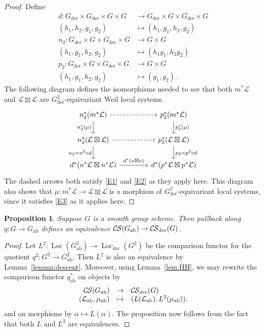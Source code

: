 \documentclass[10pt]{amsart}
\theoremstyle{plain}
\newtheorem{proposition}[theorem]{Proposition}
\theoremstyle{definition}
\DeclareMathOperator{\Loc}{Loc}
\newcommand{\der}{_{\operatorname{der}}}
\newcommand{\ab}{_{\operatorname{ab}}}
\newcommand{\cs}[1]{{\mathcal{#1}}}
\newcommand{\CS}{{\mathcal{C\hskip-0.8pt S}}}
\begin{document}
\begin{proof} 
Define
\begin{align*}
d : G\der\times G\der\times G\times G &\to G\der\times G\times G\der\times G \\
(h_1,h_2,g_1,g_2) &\mapsto (h_1, g_1, h_2, g_2)\\
n_2 : G\der\times G\times G\der\times G &\to G\times G \\
(h_1,g_1,h_2,g_2) &\mapsto (h_1g_1, h_2g_2) \\
p_2 : G\der\times G\times G\der\times G &\to G\times G \\
(h_1,g_1,h_2,g_2) &\mapsto ( g_1,g_2).
\end{align*}
The following diagram defines the isomorphisms needed to see that both $m^*\cs{L}$ and $\cs{L}\boxtimes\cs{L}$ are $G\der^2$-equivariant Weil local systems.
\[
\begin{tikzcd}[column sep=40]
\arrow{d}[swap]{n_2^*(\mu)} n_2^* (m^*\cs{L}) \arrow[dashed]{r} 
	& \arrow{d}{p_2^*(\mu)} p_2^*(m^*\cs{L})\\
\arrow{d}[swap]{n_2= n^2\circ d} n_2^*(\cs{L}\boxtimes\cs{L}) \arrow[dashed]{r} 
	& \arrow{d}{p_2= p^2\circ d} p_2^*(\cs{L}\boxtimes\cs{L}) \\
d^* (n^*\cs{L}\boxtimes n^*\cs{L}) \arrow{r}{d^*(\nu\boxtimes \nu)}& d^*(p^*\cs{L}\boxtimes p^*\cs{L}) 
\end{tikzcd}
\]
The dashed arrows both satisfy \eqref{E1} and \eqref{E2} as they apply here.
This diagram also shows that $\mu : m^*\cs{L} \to \cs{L}\boxtimes \cs{L}$ is a morphism of $G\der^2$-equivariant local systems, since it satisfies \eqref{E3} as it applies here.
\end{proof}


\begin{proposition} \label{prop:CSGabab}
Suppose $G$ is a smooth group scheme.  
Then pullback along $q : G \to G\ab$ defines an equivalence $\CS(G\ab) \to \CS\der(G)$.
\end{proposition}
\begin{proof}
Let $L^2 : \Loc(G^2\ab) \to \Loc\der(G^2)$ be the comparison functor for the quotient $q^2  : G^2 \to G^2\ab$. 
Then $L^2$ is also an equivalence by Lemma~\ref{lemma:descent}.
Moreover, using Lemma~\ref{lem:HH}, we may rewrite the comparison functor $q\ab^*$ on objects by
\[
\begin{array}{rcl}
\CS(G\ab) &\to& \CS\der(G) \\
(\cs{L}\ab,\mu\ab) &\mapsto& (L(\cs{L}\ab), L^2(\mu\ab)).
\end{array}
\]
and on morphisms by $\alpha \mapsto L(\alpha)$.
The proposition now follows from the fact that both $L$ and $L^2$ are equivalences.
\end{proof}
\end{document}
